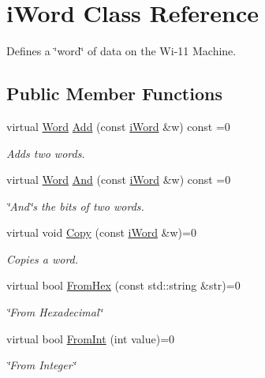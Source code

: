 \hypertarget{classiWord}{
\section{iWord Class Reference}
\label{classiWord}
}


Defines a \char`\"{}word\char`\"{} of data on the Wi-\/11 Machine.  


\subsection*{Public Member Functions}
\begin{DoxyCompactItemize}
\item 
virtual \hyperlink{classWord}{Word} \hyperlink{classiWord_ac5967eac5182607ac41b9ce6c3a74cb8}{Add} (const \hyperlink{classiWord}{iWord} \&w) const =0
\begin{DoxyCompactList}\small\item\em Adds two words. \item\end{DoxyCompactList}\item 
virtual \hyperlink{classWord}{Word} \hyperlink{classiWord_ad9caea73d7a990bf5189ba1e44ec7865}{And} (const \hyperlink{classiWord}{iWord} \&w) const =0
\begin{DoxyCompactList}\small\item\em \char`\"{}And\char`\"{}s the bits of two words. \item\end{DoxyCompactList}\item 
virtual void \hyperlink{classiWord_ac5ca71cd1defb94cd1f3536a59612a4e}{Copy} (const \hyperlink{classiWord}{iWord} \&w)=0
\begin{DoxyCompactList}\small\item\em Copies a word. \item\end{DoxyCompactList}\item 
virtual bool \hyperlink{classiWord_abd4229c26d0a2ff17b0a6bdb74240388}{FromHex} (const std::string \&str)=0
\begin{DoxyCompactList}\small\item\em \char`\"{}From Hexadecimal\char`\"{} \item\end{DoxyCompactList}\item 
virtual bool \hyperlink{classiWord_a1229f8249c32e01ccee035a205954a62}{FromInt} (int value)=0
\begin{DoxyCompactList}\small\item\em \char`\"{}From Integer\char`\"{} \item\end{DoxyCompactList}\item 

\end{DoxyCompactItemize}
